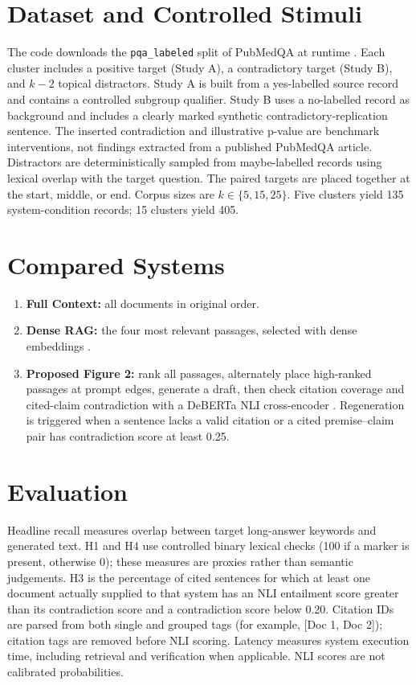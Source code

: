 \documentclass[10pt,twocolumn]{article}
\begin{document}
\section{Dataset and Controlled Stimuli}
The code downloads the \texttt{pqa\_labeled} split of PubMedQA at runtime \cite{jin2019pubmedqa}. Each cluster includes a positive target (Study A), a contradictory target (Study B), and $k-2$ topical distractors. Study A is built from a yes-labelled source record and contains a controlled subgroup qualifier. Study B uses a no-labelled record as background and includes a clearly marked synthetic contradictory-replication sentence. The inserted contradiction and illustrative p-value are benchmark interventions, not findings extracted from a published PubMedQA article. Distractors are deterministically sampled from maybe-labelled records using lexical overlap with the target question.
The paired targets are placed together at the start, middle, or end. Corpus sizes are $k\in\{5,15,25\}$. Five clusters yield 135 system-condition records; 15 clusters yield 405.
\section{Compared Systems}
\begin{enumerate}
\item \textbf{Full Context:} all documents in original order.
\item \textbf{Dense RAG:} the four most relevant passages, selected with dense embeddings \cite{lewis2020rag,reimers2019sbert}.
\item \textbf{Proposed Figure 2:} rank all passages, alternately place high-ranked passages at prompt edges, generate a draft, then check citation coverage and cited-claim contradiction with a DeBERTa NLI cross-encoder \cite{he2021deberta}. Regeneration is triggered when a sentence lacks a valid citation or a cited premise--claim pair has contradiction score at least 0.25.
\end{enumerate}
\section{Evaluation}
Headline recall measures overlap between target long-answer keywords and generated text. H1 and H4 use controlled binary lexical checks (100 if a marker is present, otherwise 0); these measures are proxies rather than semantic judgements. H3 is the percentage of cited sentences for which at least one document actually supplied to that system has an NLI entailment score greater than its contradiction score and a contradiction score below 0.20. Citation IDs are parsed from both single and grouped tags (for example, [Doc 1, Doc 2]); citation tags are removed before NLI scoring. Latency measures system execution time, including retrieval and verification when applicable. NLI scores are not calibrated probabilities.
\end{document}
